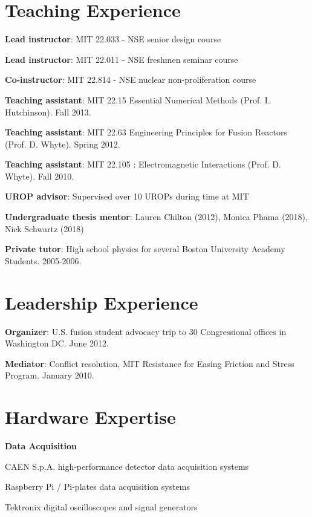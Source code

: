 \documentclass[10pt]{article}
\begin{document}
\newpage
{}

\section{Teaching Experience}
\begin{innerlist}
\item \textbf{Lead instructor}: MIT 22.033 - NSE senior design course
\item \textbf{Lead instructor}: MIT 22.011 - NSE freshmen seminar course
\item \textbf{Co-instructor}: MIT 22.814 - NSE nuclear non-proliferation course
\item \textbf{Teaching assistant}: MIT 22.15 Essential Numerical Methods (Prof. I. Hutchinson). Fall 2013.
\item \textbf{Teaching assistant}: MIT 22.63 Engineering Principles for Fusion Reactors (Prof. D. Whyte). Spring 2012.
\item \textbf{Teaching assistant}: MIT 22.105 : Electromagnetic Interactions (Prof. D. Whyte). Fall 2010.
\item \textbf{UROP advisor}: Supervised over 10 UROPs during time at MIT
\item \textbf{Undergraduate thesis mentor}: Lauren Chilton (2012), Monica Phama (2018), Nick Schwartz (2018)
\item \textbf{Private tutor}: High school physics for several Boston University Academy Students. 2005-2006. 
\end{innerlist}

\section{Leadership Experience}
\begin{innerlist}
\item \textbf{Organizer}: U.S. fusion student advocacy trip to 30 Congressional offices in Washington DC. June 2012.
\item \textbf{Mediator}: Conflict resolution, MIT Resistance for Easing Friction and Stress Program. January 2010.
\end{innerlist}

\section{Hardware Expertise}
\textbf{Data Acquisition}
\begin{innerlist}
\item CAEN S.p.A. high-performance detector data acquisition systems
\item Raspberry Pi / Pi-plates data acquisition systems
\item Tektronix digital oscilloscopes and signal generators
\end{innerlist}
\end{document}
